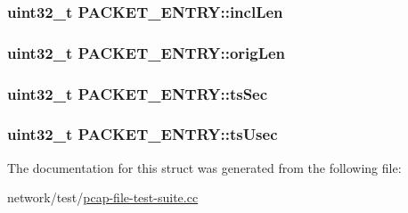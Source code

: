 \subsubsection[{\texorpdfstring{incl\+Len}{inclLen}}]{\setlength{\rightskip}{0pt plus 5cm}uint32\+\_\+t P\+A\+C\+K\+E\+T\+\_\+\+E\+N\+T\+R\+Y\+::incl\+Len}\hypertarget{structPACKET__ENTRY_ae8dd8133096a6da388506261df58ff01}{}\label{structPACKET__ENTRY_ae8dd8133096a6da388506261df58ff01}
\subsubsection[{\texorpdfstring{orig\+Len}{origLen}}]{\setlength{\rightskip}{0pt plus 5cm}uint32\+\_\+t P\+A\+C\+K\+E\+T\+\_\+\+E\+N\+T\+R\+Y\+::orig\+Len}\hypertarget{structPACKET__ENTRY_a2eb0d1882b86fd106ad82d3138273004}{}\label{structPACKET__ENTRY_a2eb0d1882b86fd106ad82d3138273004}
\subsubsection[{\texorpdfstring{ts\+Sec}{tsSec}}]{\setlength{\rightskip}{0pt plus 5cm}uint32\+\_\+t P\+A\+C\+K\+E\+T\+\_\+\+E\+N\+T\+R\+Y\+::ts\+Sec}\hypertarget{structPACKET__ENTRY_abea31e5c174a03ab6359271d6f63a648}{}\label{structPACKET__ENTRY_abea31e5c174a03ab6359271d6f63a648}
\subsubsection[{\texorpdfstring{ts\+Usec}{tsUsec}}]{\setlength{\rightskip}{0pt plus 5cm}uint32\+\_\+t P\+A\+C\+K\+E\+T\+\_\+\+E\+N\+T\+R\+Y\+::ts\+Usec}\hypertarget{structPACKET__ENTRY_a0c46e357bf2e2eec6d097408062f3cf1}{}\label{structPACKET__ENTRY_a0c46e357bf2e2eec6d097408062f3cf1}


The documentation for this struct was generated from the following file\+:\begin{DoxyCompactItemize}
\item 
network/test/\hyperlink{pcap-file-test-suite_8cc}{pcap-\/file-\/test-\/suite.\+cc}\end{DoxyCompactItemize}
